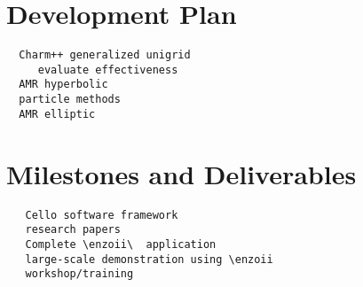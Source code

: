 \documentclass{article}
\begin{document}
\section{Development Plan} \label{s:plan} 

\begin{verbatim}
  Charm++ generalized unigrid
     evaluate effectiveness
  AMR hyperbolic
  particle methods
  AMR elliptic
\end{verbatim}

\section{Milestones and Deliverables} \label{s:milestones}

\begin{verbatim}
   Cello software framework
   research papers
   Complete \enzoii\  application
   large-scale demonstration using \enzoii
   workshop/training
\end{verbatim}



\end{document}
